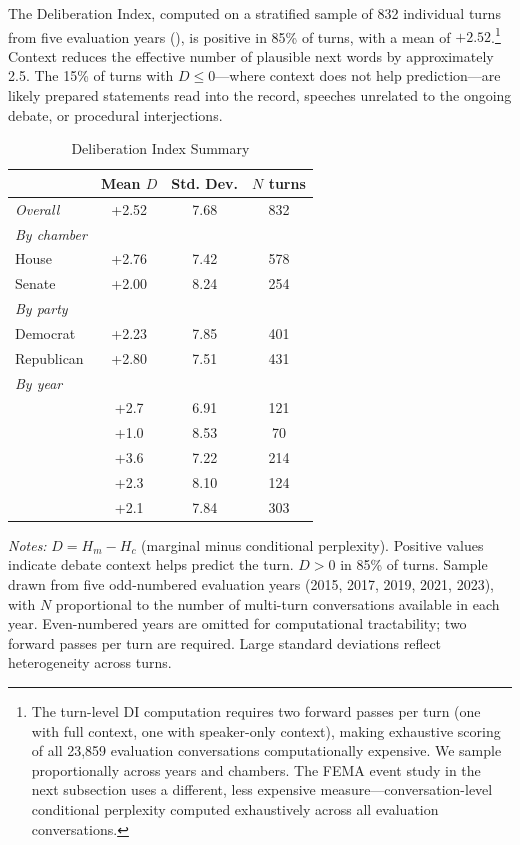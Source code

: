 \documentclass[12pt]{article}
\newcommand{\Hc}{H_c}
\newcommand{\Hm}{H_m}
\newcommand{\DI}{\mathit{D}}
\begin{document}
The Deliberation Index, computed on a stratified sample of 832 individual turns from five evaluation years (), is positive in 85\% of turns, with a mean of $+2.52$.\footnote{The turn-level DI computation requires two forward passes per turn (one with full context, one with speaker-only context), making exhaustive scoring of all 23,859 evaluation conversations computationally expensive. We sample proportionally across years and chambers. The FEMA event study in the next subsection uses a different, less expensive measure---conversation-level conditional perplexity computed exhaustively across all evaluation conversations.} Context reduces the effective number of plausible next words by approximately 2.5. The 15\% of turns with $\DI \leq 0$---where context does not help prediction---are likely prepared statements read into the record, speeches unrelated to the ongoing debate, or procedural interjections.

\begin{table}[H]
\centering
\caption{Deliberation Index Summary}
\label{tab:deliberation}
\begin{threeparttable}
\begin{tabular}{lccc}
\toprule
& Mean $\DI$ & Std. Dev. & $N$ turns \\
\midrule
\textit{Overall} & +2.52 & 7.68 & 832 \\
\midrule
\textit{By chamber} \\
\quad House & +2.76 & 7.42 & 578 \\
\quad Senate & +2.00 & 8.24 & 254 \\
\midrule
\textit{By party} \\
\quad Democrat & +2.23 & 7.85 & 401 \\
\quad Republican & +2.80 & 7.51 & 431 \\
\midrule
\textit{By year} \\
\quad 2015 & +2.7 & 6.91 & 121 \\
\quad 2017 & +1.0 & 8.53 & 70 \\
\quad 2019 & +3.6 & 7.22 & 214 \\
\quad 2021 & +2.3 & 8.10 & 124 \\
\quad 2023 & +2.1 & 7.84 & 303 \\
\bottomrule
\end{tabular}
\begin{tablenotes}[flushleft]
\small
\item \textit{Notes:} $\DI = \Hm - \Hc$ (marginal minus conditional perplexity). Positive values indicate debate context helps predict the turn. $\DI > 0$ in 85\% of turns. Sample drawn from five odd-numbered evaluation years (2015, 2017, 2019, 2021, 2023), with $N$ proportional to the number of multi-turn conversations available in each year. Even-numbered years are omitted for computational tractability; two forward passes per turn are required. Large standard deviations reflect heterogeneity across turns.
\end{tablenotes}
\end{threeparttable}
\end{table}
\end{document}
